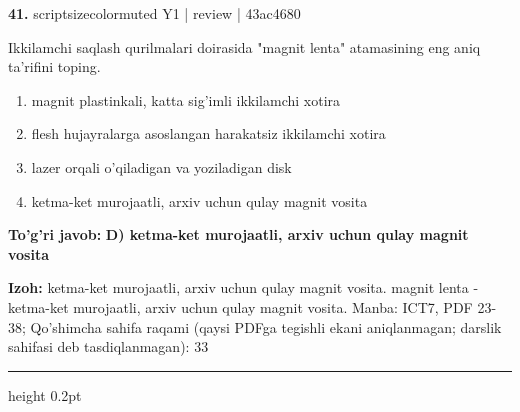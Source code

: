 \documentclass[10pt,a4paper]{article}
\begin{document}
{\bfseries\sffamily\color{ink} 41.} {scriptsizecolor{muted} Y1 | review | 43ac4680}
\par
Ikkilamchi saqlash qurilmalari doirasida "magnit lenta" atamasining eng aniq ta'rifini toping.
\begin{enumerate}[label=\Alph*),leftmargin=9mm]
\item magnit plastinkali, katta sig'imli ikkilamchi xotira
\item flesh hujayralarga asoslangan harakatsiz ikkilamchi xotira
\item lazer orqali o'qiladigan va yoziladigan disk
\item ketma-ket murojaatli, arxiv uchun qulay magnit vosita
\end{enumerate}
\begin{tcolorbox}[enhanced,breakable,colback=teal!4,colframe=teal!60!black,boxrule=0.45pt,arc=1.2mm,left=2.7mm,right=2.7mm,top=1.8mm,bottom=1.8mm,before skip=2mm,after skip=2mm]
{\bfseries\sffamily\color{teal}To'g'ri javob:} \textbf{D) ketma-ket murojaatli, arxiv uchun qulay magnit vosita}
\par\smallskip
{\bfseries Izoh:} ketma-ket murojaatli, arxiv uchun qulay magnit vosita. magnit lenta - ketma-ket murojaatli, arxiv uchun qulay magnit vosita. Manba: ICT7, PDF 23-38; Qo'shimcha sahifa raqami (qaysi PDFga tegishli ekani aniqlanmagan; darslik sahifasi deb tasdiqlanmagan): 33
\end{tcolorbox}
\vspace{2mm}\hrule height 0.2pt\vspace{3mm}
\end{document}
